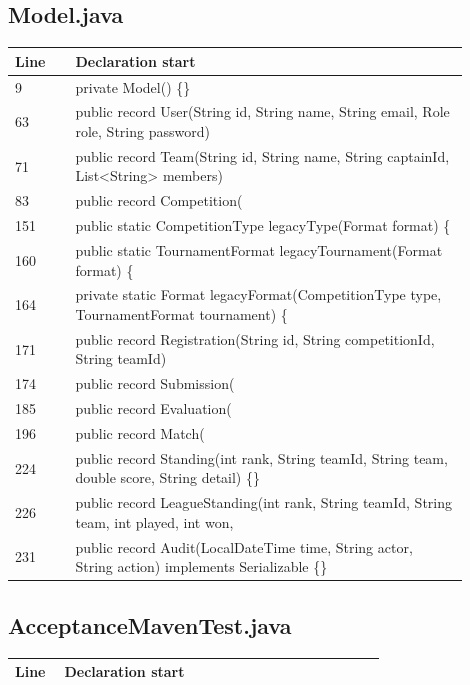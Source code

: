 \subsection*{Model.java}
\begin{longtable}{p{0.12\linewidth}p{0.78\linewidth}}\toprule Line & Declaration start\\\midrule\endhead
9 & private Model() \{\}\\
63 & public record User(String id, String name, String email, Role role, String password)\\
71 & public record Team(String id, String name, String captainId, List<String> members)\\
83 & public record Competition(\\
151 & public static CompetitionType legacyType(Format format) \{\\
160 & public static TournamentFormat legacyTournament(Format format) \{\\
164 & private static Format legacyFormat(CompetitionType type, TournamentFormat tournament) \{\\
171 & public record Registration(String id, String competitionId, String teamId)\\
174 & public record Submission(\\
185 & public record Evaluation(\\
196 & public record Match(\\
224 & public record Standing(int rank, String teamId, String team, double score, String detail) \{\}\\
226 & public record LeagueStanding(int rank, String teamId, String team, int played, int won,\\
231 & public record Audit(LocalDateTime time, String actor, String action) implements Serializable \{\}\\
\bottomrule\end{longtable}
\subsection*{AcceptanceMavenTest.java}
\begin{longtable}{p{0.12\linewidth}p{0.78\linewidth}}\toprule Line & Declaration start\\\midrule\endhead
\bottomrule\end{longtable}

